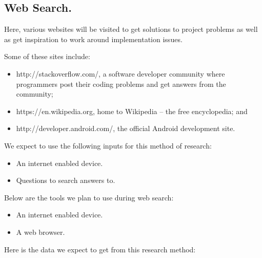 \documentclass[12pt,svgnames,smaller]{article} %
\begin{document}
		
		
		\subsection{Web Search.}
		
		Here, various websites will be visited to get solutions to project problems as well as get inspiration to work around implementation issues.
		
		Some of these sites include:
		
		\begin{itemize}
			\item http://stackoverflow.com/, a software developer community where programmers post their coding problems and get answers from the community;
			\item https://en.wikipedia.org, home to Wikipedia –  the free encyclopedia; and
			\item http://developer.android.com/, the official Android development site.
		\end{itemize}
		
		We expect to use the following inputs for this method of research:
		
		\begin{itemize}
			\item An internet enabled device.
			\item Questions to search answers to.
		\end{itemize}
		
		Below are the tools we plan to use during web search:
		
		\begin{itemize}
			\item An internet enabled device.
			\item A web browser. 
		\end{itemize}
		
		Here is the data we expect to get from this research method:
		
\end{document}
